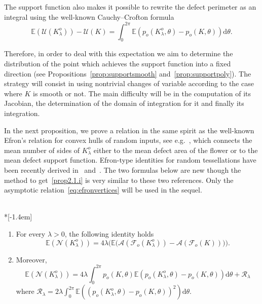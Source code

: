 \documentclass[AHL,Unicode,longabstracts,published]{cedram}
\newcommand{\cA}{\mathcal{A}}
\newcommand{\cF}{\mathcal{F}}
\newcommand{\cN}{\mathcal{N}}
\newcommand{\cR}{\mathcal{R}}
\newcommand{\cU}{\mathcal{U}}
\newcommand{\dd}{\mathrm{d}}
\newcommand{\E}{\mathbb{E}}
\newcommand{\pass}{\vspace{0.3cm}\noindent}
\newcommand{\noi}{\noindent}
\newcommand*{\romanenumi}{\renewcommand*{\theenumi}{\roman{enumi}}}
\begin{document}
The support function also makes it possible to rewrite the defect perimeter as an integral using the well-known Cauchy--Crofton formula
\begin{equation}\label{eq:croftonperimeter}
\E(\cU(K_{\lambda}^o))-\cU(K)=\int_0^{2\pi} \E(p_o(K_{\lambda}^o,\theta)-p_o(K,\theta))\dd\theta.
\end{equation}

Therefore, in order to deal with this expectation we aim to determine the distribution of the point which achieves the support function into a fixed direction (see Propositions~\ref{prop:supportsmooth} and~\ref{prop:supportpoly}). The strategy will consist in using nontrivial changes of variable according to the case where $K$ is smooth or not. The main difficulty will be in the computation of its Jacobian, the determination of the domain of integration for it and finally its integration.

In the next proposition, we prove a relation in the same spirit as the well-known Efron's relation for convex hulls of random inputs, see e.g.~\cite{Efron}, which connects the mean number of sides of $K_{\lambda}^o$ either to the mean defect area of the flower or to the mean defect support function. Efron-type identities for random tessellations have been recently derived in~\cite[Section~5]{Sch09} and~\cite[Theorem~3.1]{hhrt}. The two formulas below are new though the method to get~\eqref{prop2.1.i} is very similar to these two references. Only the asymptotic relation~\eqref{eq:efronvertices} will be used in the sequel.

\begin{prop}\label{prop:efron}\ \\*[-1.4em]
\begin{enumerate}\romanenumi
\item \label{prop2.1.i}For every $\lambda>0$, the following identity holds
\begin{equation*}
\E(\cN(K_{\lambda}^o)) = 4\lambda \big(\E\big(\cA(\cF_o(K_{\lambda}^o))-\cA(\cF_o(K))\big)\big).
\end{equation*}
\item \label{prop2.1.ii}Moreover,
\begin{equation}\label{eq:efronvertices}
\E(\cN(K_{\lambda}^o))= 4\lambda\int_0^{2\pi}p_o(K,\theta)\E(p_o(K_{\lambda}^o,\theta)-p_o(K,\theta))\dd\theta+{\cR}_\lambda
\end{equation}
where ${\cR}_\lambda=2\lambda\int_0^{2\pi}\E\left((p_o(K_{\lambda}^o,\theta)-p_o(K,\theta))^2\right)\dd\theta$.
\end{enumerate}
\end{prop}
\end{document}
